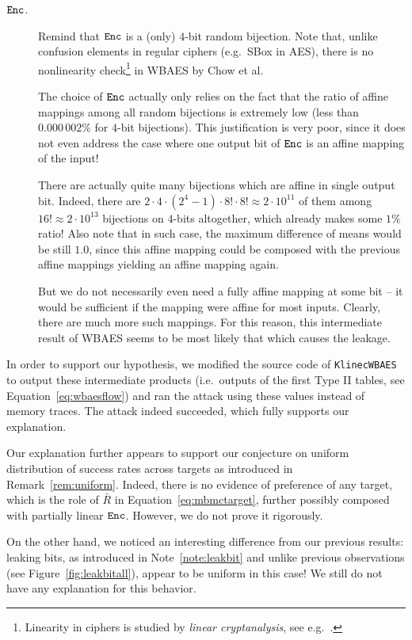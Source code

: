 \begin{description}
	\item[$\texttt{Enc}$.] Remind that $\texttt{Enc}$ is a (only) $4$-bit random bijection. Note that, unlike confusion elements in regular ciphers (e.g.\ SBox in AES), there is no nonlinearity check\footnote{Linearity in ciphers is studied by {\em linear cryptanalysis}, see e.g.\ \cite{matsui1993linear}.} in WBAES by Chow et al.
	
	The choice of $\texttt{Enc}$ actually only relies on the fact that the ratio of affine mappings among all random bijections is extremely low (less than $0.000\,002\%$ for $4$-bit bijections). This justification is very poor, since it does not even address the case where one output bit of $\texttt{Enc}$ is an affine mapping of the input!
	
	There are actually quite many bijections which are affine in single output bit. Indeed, there are $2\cdot4\cdot(2^4-1)\cdot8!\cdot8! \approx 2\cdot10^{11}$ of them among $16! \approx 2\cdot10^{13}$ bijections on $4$-bits altogether, which already makes some $1\%$ ratio! Also note that in such case, the maximum difference of means would be still $1.0$, since this affine mapping could be composed with the previous affine mappings yielding an affine mapping again.
	
	But we do not necessarily even need a fully affine mapping at some bit -- it would be sufficient if the mapping were affine for most inputs. Clearly, there are much more such mappings. For this reason, this intermediate result of WBAES seems to be most likely that which causes the leakage.
\end{description}

In order to support our hypothesis, we modified the source code of {\tt KlinecWBAES} to output these intermediate products (i.e.\ outputs of the first Type II tables, see Equation~\ref{eq:wbaesflow}) and ran the attack using these values instead of memory traces. The attack indeed succeeded, which fully supports our explanation.

\begin{note}
\label{note:leakbituniform}
	Our explanation further appears to support our conjecture on uniform distribution of success rates across targets as introduced in Remark~\ref{rem:uniform}. Indeed, there is no evidence of preference of any target, which is the role of $\bar R$ in Equation~\ref{eq:mbmctarget}, further possibly composed with partially linear $\texttt{Enc}$. However, we do not prove it rigorously.
	
	On the other hand, we noticed an interesting difference from our previous results: leaking bits, as introduced in Note~\ref{note:leakbit} and unlike previous observations (see Figure~\ref{fig:leakbitall}), appear to be uniform in this case! We still do not have any explanation for this behavior.
\end{note}

